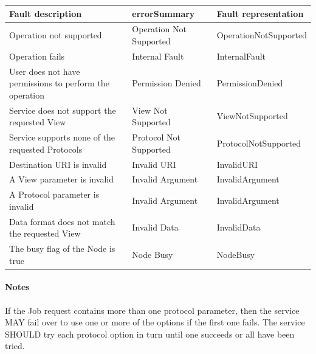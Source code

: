 \documentclass[11pt,a4paper]{ivoa}
\begin{document}
\vspace{3mm}
\begin{tabular}{ p{5cm} l p{4cm} }
\textbf{Fault description} & \textbf{errorSummary} & \textbf{Fault representation} \\
\hline
Operation not supported & Operation Not Supported & OperationNotSupported \\
\hline
Operation fails & Internal Fault & InternalFault \\
\hline
User does not have permissions to perform the operation & Permission Denied & PermissionDenied \\
\hline
Service does not support the requested View & View Not Supported & ViewNotSupported \\
\hline
Service supports none of the requested Protocols & Protocol Not Supported &ProtocolNotSupported \\
\hline
Destination URI is invalid & Invalid URI & InvalidURI \\
\hline
A View parameter is invalid & Invalid Argument & InvalidArgument \\
\hline
A Protocol parameter is invalid & Invalid Argument & InvalidArgument \\
\hline
Data format does not match the requested View & Invalid Data & InvalidData \\
\hline
The busy flag of the Node is true & Node Busy & NodeBusy \\
\hline
\end{tabular}
\vspace{3mm}

\paragraph{Notes}
If the Job request contains more than one protocol parameter, then the service MAY fail over to use one or more of the options if the first one fails. The service SHOULD try each protocol option in turn until one succeeds or all have been tried.
\end{document}
